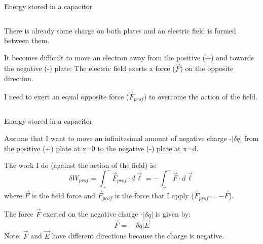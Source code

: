 \begin{frame}{Energy stored in a capacitor}
\begin{columns}
\begin{column}{0.65\textwidth}
{      \begin{itemize}
      {\small
         \item There is already some charge on both plates and an electric field is formed between them.
         \item It becomes difficult to move an electron away from the positive (+) and towards the negative (-) plate:
               The electric field exerts a force ($\vec{F}$) on the opposite direction.
         \item I need to exert an equal opposite force ($\vec{F}_{prof}$) to overcome the action of the field.
      }
      \end{itemize}
  }
  \end{column}
\end{columns}

\end{frame}


%
%
%

\begin{frame}{Energy stored in a capacitor}

Assume that I want to move an infinitesimal amount of negative charge -$|{\delta}q|$
from the positive (+) plate at x=0 to the negative (-) plate at x=d.\\

\vspace{0.2cm}

The work I do (against the action of the field) is:
\begin{equation*}
  {\delta}W_{prof} = \int_{+}^{-} \vec{F}_{prof} \cdot d\vec{\ell} = - \int_{+}^{-} \vec{F} \cdot d\vec{\ell}
\end{equation*}
where $\vec{F}$ is the field force and $\vec{F}_{prof}$ is the force that I apply ($\vec{F}_{prof} = - \vec{F}$).\\

\vspace{0.2cm}

The force $\vec{F}$ exerted on the negative charge -$|{\delta}q|$ is given by:
\begin{equation*}
  \vec{F} = -|{\delta}q| \vec{E}
\end{equation*}
Note: $\vec{F}$ and $\vec{E}$ have different directions because the charge is negative.

\end{frame}

%
%
%

